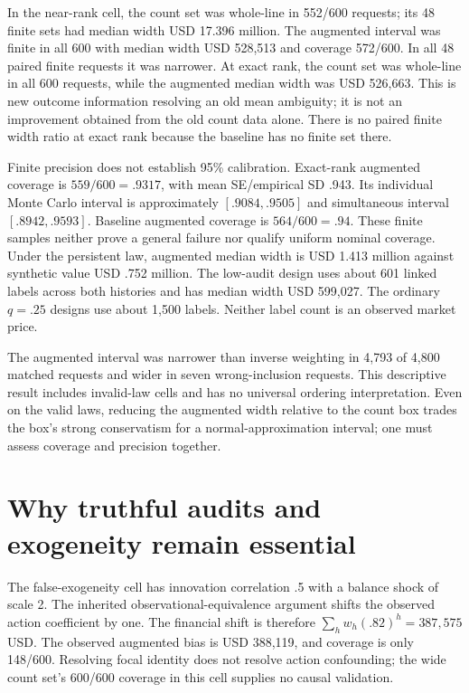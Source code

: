 \FloatBarrier

In the near-rank cell, the count set was whole-line in 552/600 requests;
its 48 finite sets had median width USD 17.396 million. The augmented
interval was finite in all 600 with median width USD 528,513 and coverage
572/600. In all 48 paired finite requests it was narrower. At exact rank,
the count set was whole-line in all 600 requests, while the augmented median
width was USD 526,663. This is new outcome information resolving an old
mean ambiguity; it is not an improvement obtained from the old count data
alone. There is no paired finite width ratio at exact rank because the
baseline has no finite set there.

Finite precision does not establish 95\% calibration. Exact-rank augmented
coverage is $559/600=.9317$, with mean SE/empirical SD .943. Its individual
Monte Carlo interval is approximately $[.9084,.9505]$ and simultaneous
interval $[.8942,.9593]$. Baseline augmented coverage is \mbox{$564/600=.94$}.
These finite samples neither prove a general failure nor qualify uniform
nominal coverage. Under the persistent law, augmented median width is USD
1.413 million against synthetic value USD .752 million. The low-audit
design uses about 601 linked labels across both histories and has median
width USD 599,027. The ordinary $q=.25$ designs use about 1,500 labels.
Neither label count is an observed market price.

The augmented interval was narrower than inverse weighting in 4,793 of
4,800 matched requests and wider in seven wrong-inclusion requests. This
descriptive result includes invalid-law cells and has no universal ordering
interpretation. Even on the valid laws, reducing the augmented width relative
to the count box trades the box's strong conservatism for a normal-approximation
interval; one must assess coverage and precision together.

\section{Why truthful audits and exogeneity remain essential}

The false-exogeneity cell has innovation correlation .5 with a balance shock
of scale 2. The inherited observational-equivalence argument shifts the
observed action coefficient by one. The financial shift is therefore
$\sum_h w_h(.82)^h=387{,}575$ USD. The observed augmented bias is USD 388,119,
and coverage is only 148/600. Resolving focal identity does not resolve action
confounding; the wide count set's 600/600 coverage in this cell supplies no
causal validation.

